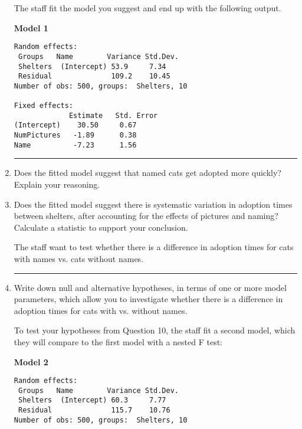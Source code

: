 \documentclass[11pt]{article}
\begin{document}
\begin{enumerate}
\pagebreak


The staff fit the model you suggest and end up with the following output. 

\textbf{Model 1} 

\begin{verbatim}
Random effects:
 Groups   Name        Variance Std.Dev.
 Shelters  (Intercept) 53.9     7.34  
 Residual              109.2    10.45  
Number of obs: 500, groups:  Shelters, 10

Fixed effects:
             Estimate   Std. Error 
(Intercept)    30.50     0.67      
NumPictures   -1.89      0.38  
Name          -7.23      1.56
\end{verbatim}

\rule{\textwidth}{1pt}

\item Does the fitted model suggest that named cats get adopted more quickly? Explain your reasoning.

\vspace{5cm} 

\item Does the fitted model suggest there is systematic variation in adoption times between shelters, after accounting for the effects of pictures and naming? Calculate a statistic to support your conclusion.


\pagebreak

The staff want to test whether there is a difference in adoption times for cats with names vs. cats without names.

\rule{\textwidth}{1pt}

\item Write down null and alternative hypotheses, in terms of one or more model parameters, which allow you to investigate whether there is a difference in adoption times for cats with vs. without names.

\vspace{4cm}

To test your hypotheses from Question 10, the staff fit a second model, which they will compare to the first model with a nested F test:

\textbf{Model 2} 

\begin{verbatim}
Random effects:
 Groups   Name        Variance Std.Dev.
 Shelters  (Intercept) 60.3     7.77
 Residual              115.7    10.76 
Number of obs: 500, groups:  Shelters, 10


\end{verbatim}
\end{enumerate}
\end{document}
